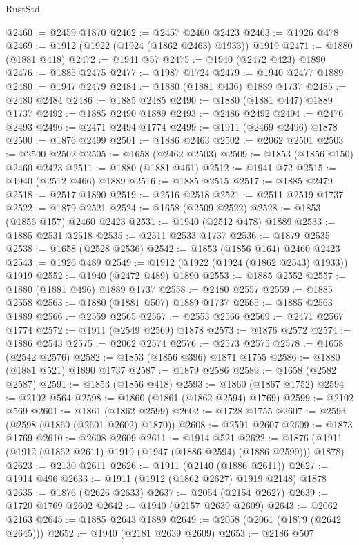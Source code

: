 \begin{lexlean}{RustStd}
\begin{coremodule}
{\begin{coremodule}
{{{{{{{{{{{{{{{{{{{{{{{{{{{{{@2460 := @2459 @1870
@2462 := @2457 @2460 @2423
@2463 := @1926 @478
@2469 := @1912 (@1922 (@1924 (@1862 @2463) @1933)) @1919
@2471 := @1880 (@1881 @418)
@2472 := @1941 @57
@2475 := @1940 (@2472 @423) @1890
@2476 := @1885 @2475
@2477 := @1987 @1724
@2479 := @1940 @2477 @1889
@2480 := @1947 @2479
@2484 := @1880 (@1881 @436) @1889 @1737
@2485 := @2480 @2484
@2486 := @1885 @2485
@2490 := @1880 (@1881 @447) @1889 @1737
@2492 := @1885 @2490 @1889
@2493 := @2486 @2492
@2494 := @2476 @2493
@2496 := @2471 @2494 @1774
@2499 := @1911 (@2469 @2496) @1878
@2500 := @1876 @2499
@2501 := @1886 @2463
@2502 := @2062 @2501
@2503 := @2500 @2502
@2505 := @1658 (@2462 @2503)
@2509 := @1853 (@1856 @150) @2460 @2423
@2511 := @1880 (@1881 @461)
@2512 := @1941 @72
@2515 := @1940 (@2512 @466) @1889
@2516 := @1885 @2515
@2517 := @1885 @2479
@2518 := @2517 @1890
@2519 := @2516 @2518
@2521 := @2511 @2519 @1737
@2522 := @1879 @2521
@2524 := @1658 (@2509 @2522)
@2528 := @1853 (@1856 @157) @2460 @2423
@2531 := @1940 (@2512 @478) @1889
@2533 := @1885 @2531 @2518
@2535 := @2511 @2533 @1737
@2536 := @1879 @2535
@2538 := @1658 (@2528 @2536)
@2542 := @1853 (@1856 @164) @2460 @2423
@2543 := @1926 @489
@2549 := @1912 (@1922 (@1924 (@1862 @2543) @1933)) @1919
@2552 := @1940 (@2472 @489) @1890
@2553 := @1885 @2552
@2557 := @1880 (@1881 @496) @1889 @1737
@2558 := @2480 @2557
@2559 := @1885 @2558
@2563 := @1880 (@1881 @507) @1889 @1737
@2565 := @1885 @2563 @1889
@2566 := @2559 @2565
@2567 := @2553 @2566
@2569 := @2471 @2567 @1774
@2572 := @1911 (@2549 @2569) @1878
@2573 := @1876 @2572
@2574 := @1886 @2543
@2575 := @2062 @2574
@2576 := @2573 @2575
@2578 := @1658 (@2542 @2576)
@2582 := @1853 (@1856 @396) @1871 @1755
@2586 := @1880 (@1881 @521) @1890 @1737
@2587 := @1879 @2586
@2589 := @1658 (@2582 @2587)
@2591 := @1853 (@1856 @418)
@2593 := @1860 (@1867 @1752)
@2594 := @2102 @564
@2598 := @1860 (@1861 (@1862 @2594) @1769)
@2599 := @2102 @569
@2601 := @1861 (@1862 @2599)
@2602 := @1728 @1755
@2607 := @2593 (@2598 (@1860 (@2601 @2602) @1870))
@2608 := @2591 @2607
@2609 := @1873 @1769
@2610 := @2608 @2609
@2611 := @1914 @521
@2622 := @1876 (@1911 (@1912 (@1862 @2611) @1919 (@1947 (@1886 @2594) (@1886 @2599))) @1878)
@2623 := @2130 @2611
@2626 := @1911 (@2140 (@1886 @2611))
@2627 := @1914 @496
@2633 := @1911 (@1912 (@1862 @2627) @1919 @2148) @1878
@2635 := @1876 (@2626 @2633)
@2637 := @2054 (@2154 @2627)
@2639 := @1720 @1769 @2602
@2642 := @1940 (@2157 @2639 @2609)
@2643 := @2062 @2163
@2645 := @1885 @2643 @1889
@2649 := @2058 (@2061 (@1879 (@2642 @2645)))
@2652 := @1940 (@2181 @2639 @2609)
@2653 := @2186 @507
}}}}}}}}}}}}}}}}}}}}}}}}}}}}}
\end{coremodule}}
\end{coremodule}
\end{lexlean}
